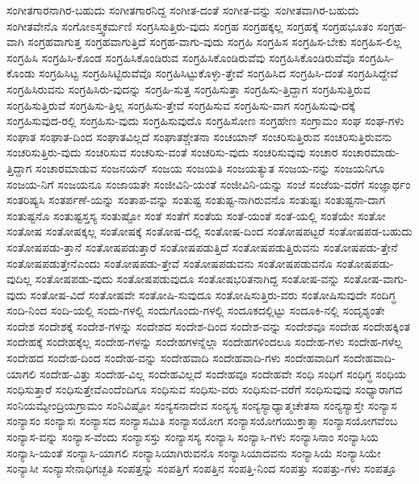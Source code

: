 {ಸಂಗೀತಗಾರನಾಗಿರ-ಬಹುದು
ಸಂಗೀತಗಾರನಿದ್ದ
ಸಂಗೀತ-ದಂತೆ
ಸಂಗೀತ-ವನ್ನು
ಸಂಗೀತವಾಗಿರ-ಬಹುದು
ಸಂಗೀತವೇನೊ
ಸಂಗೋಽಸ್ತ್ವಕರ್ಮಣಿ
ಸಂಗ್ರಸಿಸುತ್ತಿರು-ವುದು
ಸಂಗ್ರಹ
ಸಂಗ್ರಹಕ್ಕಲ್ಲ
ಸಂಗ್ರಹಕ್ಕೆ
ಸಂಗ್ರಹಭೂತಂ
ಸಂಗ್ರಹ-ವಾಗಿ
ಸಂಗ್ರಹವಾಗುತ್ತ
ಸಂಗ್ರಹವಾಗುತ್ತಿದೆ
ಸಂಗ್ರಹ-ವಾಗು-ವುದು
ಸಂಗ್ರಹಿ
ಸಂಗ್ರಹಿಸ
ಸಂಗ್ರಹಿಸ-ಬೇಕು
ಸಂಗ್ರಹಿಸ-ಲಿಲ್ಲ
ಸಂಗ್ರಹಿಸಿ
ಸಂಗ್ರಹಿಸಿ-ಕೊಂಡ
ಸಂಗ್ರಹಿಸಿಕೊಂಡಿರುವ
ಸಂಗ್ರಹಿಸಿಕೊಂಡಿರುವೆವು
ಸಂಗ್ರಹಿಸಿಕೊಂಡಿರುವೆವೊ
ಸಂಗ್ರಹಿಸಿ-ಕೊಂಡು
ಸಂಗ್ರಹಿಸಿಟ್ಟ
ಸಂಗ್ರಹಿಸಿಟ್ಟಿರುವೆವೊ
ಸಂಗ್ರಹಿಸಿಟ್ಟುಕೊಳ್ಳು-ತ್ತೇವೆ
ಸಂಗ್ರಹಿಸಿದ
ಸಂಗ್ರಹಿಸಿ-ದಂತೆ
ಸಂಗ್ರಹಿಸಿದ್ದೇವೆ
ಸಂಗ್ರಹಿಸಿರುವನು
ಸಂಗ್ರಹಿಸಿರು-ವುದನ್ನು
ಸಂಗ್ರಹಿ-ಸುತ್ತ
ಸಂಗ್ರಹಿಸುತ್ತಾ
ಸಂಗ್ರಹಿಸು-ತ್ತಿದ್ದಾಗ
ಸಂಗ್ರಹಿಸುತ್ತಿರುವ
ಸಂಗ್ರಹಿಸುತ್ತಿರುವೆ
ಸಂಗ್ರಹಿಸು-ತ್ತಿಲ್ಲ
ಸಂಗ್ರಹಿಸು-ತ್ತೇವೆ
ಸಂಗ್ರಹಿಸುವ
ಸಂಗ್ರಹಿಸು-ವಾಗ
ಸಂಗ್ರಹಿಸುವು-ದಕ್ಕೆ
ಸಂಗ್ರಹಿಸುವುದ-ರಲ್ಲಿ
ಸಂಗ್ರಹಿಸು-ವುದು
ಸಂಗ್ರಹಿಸುವುದೊ
ಸಂಗ್ರಹಿಸೋಣ
ಸಂಗ್ರಹೇಣ
ಸಂಗ್ರಾಮಂ
ಸಂಘ
ಸಂಘ-ಗಳು
ಸಂಘಾತ
ಸಂಘಾತ-ದಿಂದ
ಸಂಘಾತವಿಲ್ಲದೆ
ಸಂಘಾತಶ್ಚೇತನಾ
ಸಂಚಯಾನ್
ಸಂಚರಿಸುತ್ತಿರುವ
ಸಂಚರಿಸುತ್ತಿರುವನು
ಸಂಚರಿಸುತ್ತಿರು-ವುದು
ಸಂಚರಿಸುವ
ಸಂಚರಿಸು-ವಂತೆ
ಸಂಚರಿಸು-ವುದು
ಸಂಚರಿಸುವುವು
ಸಂಚಾರ
ಸಂಚಾರಮಾಡು-ತ್ತಿದ್ದಾಗ
ಸಂಚಾರಮಾಡುವ
ಸಂಜನಯನ್
ಸಂಜಯ
ಸಂಜಯತಿ
ಸಂಜಯತ್ಯುತ
ಸಂಜಯ-ನನ್ನು
ಸಂಜಯನಿಗೂ
ಸಂಜಯ-ನಿಗೆ
ಸಂಜಯನೂ
ಸಂಜಾಯತೇ
ಸಂಜೀವಿನಿ-ಯಂತೆ
ಸಂಜೀವಿನಿ-ಯನ್ನು
ಸಂಜೆ
ಸಂಜೆಯ-ವರೆಗೆ
ಸಂಜ್ಞಾರ್ಥಂ
ಸಂತರಿಷ್ಯಸಿ
ಸಂತರ್ಪಣೆ-ಯನ್ನು
ಸಂತಾಪ-ವನ್ನು
ಸಂತುಷ್ಟ
ಸಂತುಷ್ಟ-ನಾಗಿರುವನೊ
ಸಂತುಷ್ಟಃ
ಸಂತುಷ್ಟನಾ-ದಾಗ
ಸಂತುಷ್ಟನೊ
ಸಂತುಷ್ಟಸ್ತಸ್ಯ
ಸಂತುಷ್ಟೋ
ಸಂತೆ
ಸಂತೆಗೆ
ಸಂತೆಯ
ಸಂತೆ-ಯಂತೆ
ಸಂತೆ-ಯಲ್ಲಿ
ಸಂತೆಯೇ
ಸಂತೋ
ಸಂತೋಷ
ಸಂತೋಷಕ್ಕಲ್ಲ
ಸಂತೋಷಕ್ಕೆ
ಸಂತೋಷ-ದಲ್ಲಿ
ಸಂತೋಷ-ದಿಂದ
ಸಂತೋಷಪಟ್ಟರೆ
ಸಂತೋಷಪಡ-ಬಹುದು
ಸಂತೋಷಪಡು-ತ್ತಾನೆ
ಸಂತೋಷಪಡುತ್ತಾರೆ
ಸಂತೋಷಪಡುತ್ತಿದೆ
ಸಂತೋಷಪಡುತ್ತಿರುವನು
ಸಂತೋಷಪಡು-ತ್ತೇನೆ
ಸಂತೋಷಪಡುತ್ತೇನೆಎಂದು
ಸಂತೋಷಪಡು-ತ್ತೇವೆ
ಸಂತೋಷಪಡುವನು
ಸಂತೋಷಪಡುವನೊ
ಸಂತೋಷಪಡು-ವುದಿಲ್ಲ
ಸಂತೋಷಪಡು-ವುದು
ಸಂತೋಷಪಡುವುದೂ
ಸಂತೋಷಭರಿತನಾಗಿದ್ದ
ಸಂತೋಷ-ವನ್ನು
ಸಂತೋಷ-ವಾಗು-ವುದು
ಸಂತೋಷ-ವಿದೆ
ಸಂತೋಷವೇ
ಸಂತೋಷಿ-ಸುವುದೂ
ಸಂತೋಷಿಸುತ್ತಿರು-ವರು
ಸಂತೋಷಿಸುವುದೇ
ಸಂದಿಗ್ಧ
ಸಂದಿ-ನಿಂದ
ಸಂದಿ-ಯಲ್ಲಿ
ಸಂದು-ಗಳಲ್ಲಿ
ಸಂದುಗೊಂದು-ಗಳಲ್ಲಿ
ಸಂದೂಕದಲ್ಲಿಟ್ಟು
ಸಂದೂಕಿ-ನಲ್ಲಿ
ಸಂದೃಶ್ಯಂತೇ
ಸಂದೇಶ
ಸಂದೇಶಕ್ಕೆ
ಸಂದೇಶ-ಗಳನ್ನು
ಸಂದೇಶದ
ಸಂದೇಶ-ದಿಂದ
ಸಂದೇಶ-ವನ್ನು
ಸಂದೇಶವೂ
ಸಂದೇಹ
ಸಂದೇಹಕ್ಕಿಂತ
ಸಂದೇಹಕ್ಕೆ
ಸಂದೇಹಕ್ಕೆಲ್ಲ
ಸಂದೇಹ-ಗಳನ್ನು
ಸಂದೇಹಗಳನ್ನೆಲ್ಲಾ
ಸಂದೇಹಗಳಿಂದಲೂ
ಸಂದೇಹ-ಗಳು
ಸಂದೇಹ-ಗಳೆಲ್ಲ
ಸಂದೇಹದ
ಸಂದೇಹ-ದಿಂದ
ಸಂದೇಹ-ವನ್ನು
ಸಂದೇಹವಾದಿ
ಸಂದೇಹವಾದಿ-ಗಳು
ಸಂದೇಹವಾದಿಗೆ
ಸಂದೇಹವಾದಿ-ಯಾಗಲಿ
ಸಂದೇಹ-ವಿತ್ತು
ಸಂದೇಹ-ವಿಲ್ಲ
ಸಂದೇಹವಿಲ್ಲದೆ
ಸಂದೇಹವೂ
ಸಂದೇಹವೇ
ಸಂಧಿ
ಸಂಧಿಗೆ
ಸಂಧಿಗ್ಧ
ಸಂಧಿಯ
ಸಂಧಿಸುತ್ತಾರೆ
ಸಂಧಿಸುತ್ತೇವೆಎಂದೆಂದಿಗೂ
ಸಂಧಿಸುವ
ಸಂಧಿಸು-ವರು
ಸಂಧಿಸುವ-ವರೆಗೆ
ಸಂಧಿಸುವುವು
ಸಂಧ್ಯಾರಾಗದ
ಸಂನಿಯಮ್ಯೇಂದ್ರಿಯಗ್ರಾಮಂ
ಸಂನಿವಿಷ್ಟೋ
ಸಂನ್ಯಸನಾದೇವ
ಸಂನ್ಯಸ್ಯ
ಸಂನ್ಯಸ್ಯಾಧ್ಯಾತ್ಮಚೇತಸಾ
ಸಂನ್ಯಸ್ಯಾಸ್ತೇ
ಸಂನ್ಯಾಸ
ಸಂನ್ಯಾಸಂ
ಸಂನ್ಯಾಸಃ
ಸಂನ್ಯಾಸದ
ಸಂನ್ಯಾಸಮಿತಿ
ಸಂನ್ಯಾಸಯೋಗ
ಸಂನ್ಯಾಸಯೋಗಯುಕ್ತಾತ್ಮಾ
ಸಂನ್ಯಾಸಯೋಗವೆಂಬ
ಸಂನ್ಯಾಸ-ವನ್ನು
ಸಂನ್ಯಾಸ-ವೆಂದು
ಸಂನ್ಯಾಸಸ್ತು
ಸಂನ್ಯಾಸಸ್ಯ
ಸಂನ್ಯಾಸಿ
ಸಂನ್ಯಾಸಿ-ಗಳು
ಸಂನ್ಯಾಸಿನಾಂ
ಸಂನ್ಯಾಸಿಯ
ಸಂನ್ಯಾಸಿ-ಯಂತೆ
ಸಂನ್ಯಾಸಿ-ಯಾಗಲಿ
ಸಂನ್ಯಾಸಿಯಾಗಿರುವನೊ
ಸಂನ್ಯಾಸಿಯಾದವನು
ಸಂನ್ಯಾಸಿಯೆ
ಸಂನ್ಯಾಸಿಯೇ
ಸಂನ್ಯಾಸೀ
ಸಂನ್ಯಾಸೇನಾಧಿಗಚ್ಛತಿ
ಸಂಪತ್ತನ್ನು
ಸಂಪತ್ತಿಗೆ
ಸಂಪತ್ತಿನ
ಸಂಪತ್ತಿ-ನಿಂದ
ಸಂಪತ್ತು
ಸಂಪತ್ತು-ಗಳು
ಸಂಪತ್ತೂ
}
